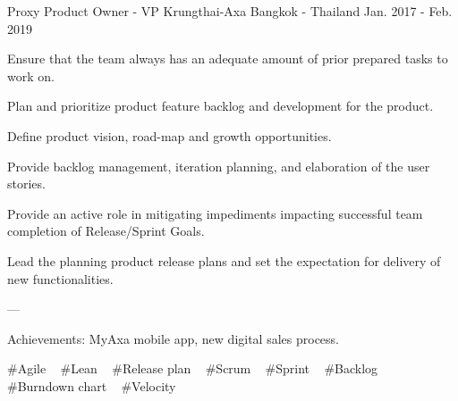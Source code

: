 \begin{cventries}
  \cventry
    {Proxy Product Owner - VP} %
    {Krungthai-Axa} %
    {Bangkok - Thailand} %
    {Jan. 2017 - Feb. 2019} %
    {
      \begin{cvitems} %
        \item {Ensure that the team always has an adequate amount of prior prepared tasks to work on.}
        \item {Plan and prioritize product feature backlog and development for the product.}
        \item {Define product vision, road-map and growth opportunities.}
        \item {Provide backlog management, iteration planning, and elaboration of the user stories.}
        \item {Provide an active role in mitigating impediments impacting successful team completion of Release/Sprint Goals.}
        \item {Lead the planning product release plans and set the expectation for delivery of new functionalities.}
        \item {---}
        \item {Achievements: MyAxa mobile app, new digital sales process.}
      \end{cvitems}
    }
    {
      \#Agile ~
      \#Lean ~
      \#Release plan ~
      \#Scrum ~
      \#Sprint ~
      \#Backlog ~
      \#Burndown chart ~
      \#Velocity ~
    }


\end{cventries}
